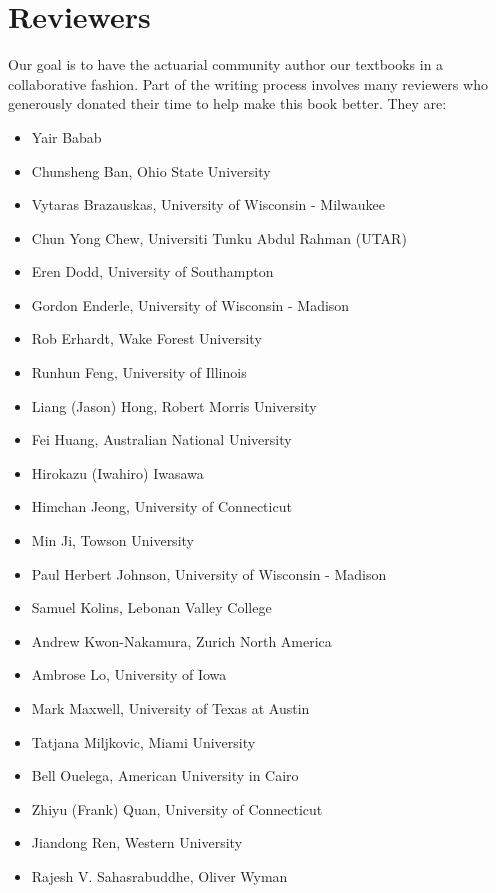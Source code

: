 \documentclass[]{book}
\providecommand{\tightlist}{%
  \setlength{\itemsep}{0pt}\setlength{\parskip}{0pt}}
\theoremstyle{definition}
\theoremstyle{definition}
\theoremstyle{definition}
\theoremstyle{remark}
\begin{document}
\section*{Reviewers}\label{reviewers}

Our goal is to have the actuarial community author our textbooks in a
collaborative fashion. Part of the writing process involves many
reviewers who generously donated their time to help make this book
better. They are:

\begin{itemize}
\tightlist
\item
  Yair Babab
\item
  Chunsheng Ban, Ohio State University
\item
  Vytaras Brazauskas, University of Wisconsin - Milwaukee
\item
  Chun Yong Chew, Universiti Tunku Abdul Rahman (UTAR)
\item
  Eren Dodd, University of Southampton
\item
  Gordon Enderle, University of Wisconsin - Madison
\item
  Rob Erhardt, Wake Forest University
\item
  Runhun Feng, University of Illinois
\item
  Liang (Jason) Hong, Robert Morris University
\item
  Fei Huang, Australian National University
\item
  Hirokazu (Iwahiro) Iwasawa
\item
  Himchan Jeong, University of Connecticut
\item
  Min Ji, Towson University
\item
  Paul Herbert Johnson, University of Wisconsin - Madison
\item
  Samuel Kolins, Lebonan Valley College
\item
  Andrew Kwon-Nakamura, Zurich North America
\item
  Ambrose Lo, University of Iowa
\item
  Mark Maxwell, University of Texas at Austin
\item
  Tatjana Miljkovic, Miami University
\item
  Bell Ouelega, American University in Cairo
\item
  Zhiyu (Frank) Quan, University of Connecticut
\item
  Jiandong Ren, Western University
\item
  Rajesh V. Sahasrabuddhe, Oliver Wyman

\end{itemize}
\end{document}
